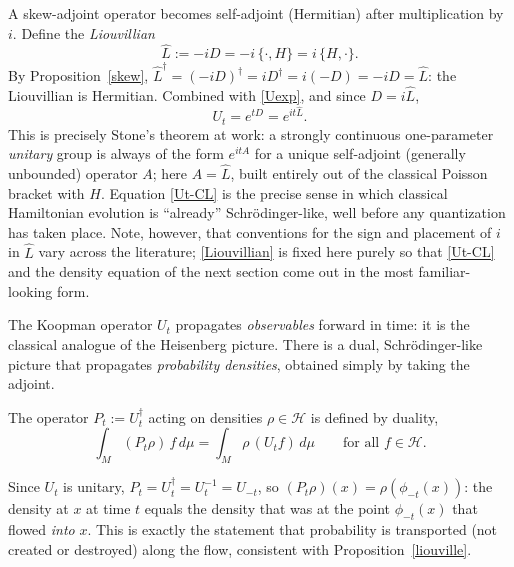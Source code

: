 A skew-adjoint operator becomes self-adjoint (Hermitian) after multiplication 
by $i$. Define the \emph{Liouvillian}
\begin{equation}
\boxed{\hat L := -i D = -i\,\{\cdot,H\} = i\,\{H,\cdot\}. }
\label{Liouvillian}
\end{equation}
By Proposition~\ref{skew}, $\hat L^\dagger=(-i D)^\dagger = i D^\dagger = 
i(-D)=-i D=\hat L$: the Liouvillian is Hermitian. Combined with \eqref{Uexp}, 
and since $D=i\hat L$,
\begin{equation}
U_t = e^{tD} = e^{i t\hat L}.
\label{Ut-CL}
\end{equation}
This is precisely Stone's theorem \cite{Stone1932} at work: a strongly continuous
one-parameter \emph{unitary} group is always of the form $e^{i t A}$ for a
unique self-adjoint (generally unbounded) operator $A$; here $A=\hat L$, built
entirely out of the classical Poisson bracket with $H$. Equation \eqref{Ut-CL}
is the precise sense in which classical Hamiltonian evolution is ``already''
Schr\"odinger-like, well before any quantization has taken place. Note,
however, that conventions for the sign and placement of $i$ in $\hat L$ vary
across the literature; \eqref{Liouvillian} is fixed here purely so that
\eqref{Ut-CL} and the density equation of the next section come out in the most
familiar-looking form.


The Koopman operator $U_t$ propagates \emph{observables} forward in time: it is
the classical analogue of the Heisenberg picture. There is a dual,
Schr\"odinger-like picture that propagates \emph{probability densities},
obtained simply by taking the adjoint.

\begin{definition}
The operator $P_t := U_t^\dagger$ acting on densities 
    $\rho\in\mathcal H$ is defined by duality,
\begin{equation}
\int_M (P_t\rho)\,f\,d\mu = \int_M \rho\,(U_tf)\,d\mu 
    \qquad \text{for all } f\in\mathcal H.
\end{equation}
\end{definition}

Since $U_t$ is unitary, $P_t = U_t^\dagger = U_t^{-1}=U_{-t}$, so $(P_t\rho)(x)
= \rho(\phi_{-t}(x))$: the density at $x$ at time $t$ equals the density that
was at the point $\phi_{-t}(x)$ that flowed \emph{into} $x$. This is exactly
the statement that probability is transported (not created or destroyed) along
the flow, consistent with Proposition~\ref{liouville}.

